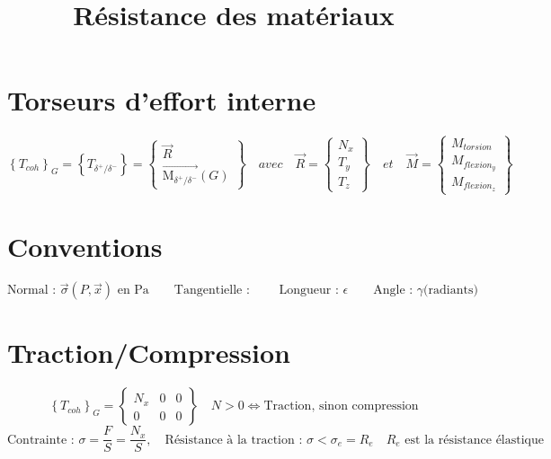 \documentclass{article}
\title{Résistance des matériaux}
\begin{document}
	\section*{Torseurs d'effort interne}
	$$ \left\lbrace T_{coh}\right\rbrace _G=\left\lbrace T_{\delta^+/\delta^-}\right\rbrace=\left\lbrace\begin{array}{c}
		\overrightarrow{R}\\ \overrightarrow{\textrm{M}_{\delta^+/\delta^-}}(G)
		\end{array}\right\rbrace \quad  avec \quad \overrightarrow{R} = \left\lbrace \begin{array}{c}
	N_x \\ T_y \\ T_z
	\end{array} \right\rbrace \quad et \quad \overrightarrow{M} = \left\lbrace \begin{array}{c}
	M_{torsion} \\ M_{flexion_y} \\  M_{flexion_z}
	\end{array} \right\rbrace $$
	\section*{Conventions}
	$$ \text{Normal : } \vec{\sigma}(P,\vec{x}) \text{ en Pa} \qquad \text{Tangentielle : } \qquad \text{Longueur : } \epsilon \qquad \text{Angle : } \gamma \text{(radiants)} $$
	\section*{Traction/Compression}
	$$ \left\lbrace T_{coh}\right\rbrace_G = \left\lbrace \begin{array}{ccc}
	N_x & 0 & 0\\ 0& 0& 0
	\end{array} \right\rbrace \quad N>0 \Leftrightarrow \text{Traction, sinon compression} $$
	$$ \text{Contrainte : } \sigma = \dfrac{F}{S}=\dfrac{N_x}{S}, \quad \text{Résistance à la traction : } \sigma<\sigma_e=R_e \quad R_e \text{ est la résistance élastique}$$
\end{document}
